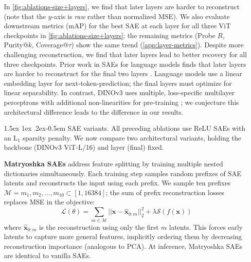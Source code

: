 \documentclass[runningheads]{llncs}
\makeatletter
\renewcommand{\paragraph}{%
  \@startsection{paragraph}{4}%
  {\z@}{1.5ex \@plus 1ex \@minus .2ex}{-0.5em}%
  {\normalfont\normalsize\bfseries}%
}
\makeatother
\begin{document}
In \cref{fig:ablations-size+layers}, we find that later layers are harder to reconstruct (note that the $y$-axis is \textit{raw} rather than normalized MSE).
We also evaluate downstream metrics (mAP) for the best SAE at each layer for all three ViT checkpoints in \cref{fig:ablations-size+layers}; the remaining metrics (Probe $R$, Purity@$k$, Coverage@$\tau$) show the same trend (\cref{app:layer-metrics}).
Despite more challenging reconstruction, we find that later layers lead to better recovery for all three checkpoints.
Prior work in SAEs for language models finds that later layers are harder to reconstruct  for the final two layers \citep{gao2025scaling}.  %
Language models use a linear embedding layer for next-token-prediction; the final layers must optimize for linear separability.
In contrast, DINOv3 uses multiple, loss-specific multilayer perceptrons with additional non-linearities for pre-training \citep{simeoni2025dinov3}; we conjecture this architectural difference leads to the difference in our results.

\paragraph{SAE variants.}\label{sec:ablation-topk}
All preceding ablations use ReLU SAEs with an L$_1$ sparsity penalty.
We now compare two architectural variants, holding the backbone (DINOv3 ViT-L/16) and layer (final) fixed.

\textbf{Matryoshka SAEs} \citep{bussmann2025matryoshka} address feature splitting \citep{bricken2023monosemanticity,chanin2024absorption,leask2025sparse} by training multiple nested dictionaries simultaneously.
Each training step samples random prefixes of SAE latents and reconstructs the input using each prefix.
We sample ten prefixes $\mathcal{M} = m_1, m_2, \ldots, m_{10} \subset [1, 16384]$; the sum of prefix reconstruction losses replaces MSE in the objective:
\begin{equation}\label{eq:matryoshka-objective}
\mathcal{L}(\theta) = \sum_{m \in \mathcal{M}} ||\mathbf{x}-\mathbf{\hat{x}}_{0:m}||^2_2 + \lambda \mathcal{S}(f(\mathbf{x}))
\end{equation}
where $\mathbf{\hat{x}}_{0:m}$ is the reconstruction using only the first $m$ latents.
This forces early latents to capture more general features, implicitly ordering them by decreasing reconstruction importance (analogous to PCA).
At inference, Matryoshka SAEs are identical to vanilla SAEs.
\end{document}
